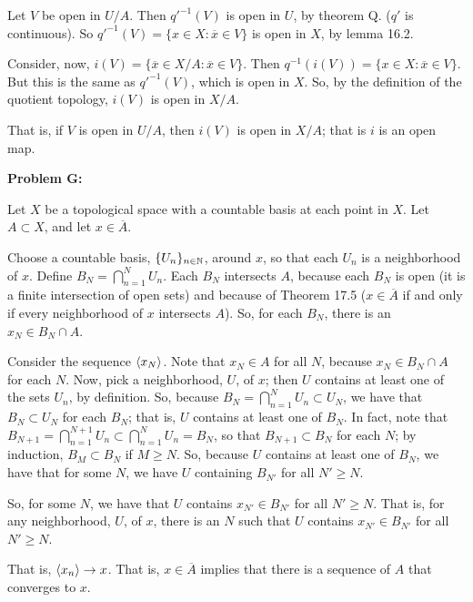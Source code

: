 \documentclass[a4paper,12pt]{article}
\begin{document}
Let $V$ be open in $U/A$. Then $q'^{-1}(V)$ is open in $U$, by theorem Q. ($q'$ is continuous). So $q'^{-1}(V) = \{x \in X: \overline{x} \in V\}$ is open in $X$, by lemma 16.2.

Consider, now, $i(V) = \{\overline{x} \in X/A: \overline{x} \in V\}$. Then $q^{-1}(i(V)) = \{x \in X: \overline{x} \in V\}$. But this is the same as $q'^{-1}(V)$, which is open in $X$. So, by the definition of the quotient topology, $i(V)$ is open in $X/A$.

That is, if $V$ is open in $U/A$, then $i(V)$ is open in $X/A$; that is $i$ is an open map.

\shunt

{\bf Problem G:}

Let $X$ be a topological space with a countable basis at each point in $X$. Let $A \subset X$, and let $x \in \overline{A}$.

Choose a countable basis, $\{U_n\}_{n \in \mathbb{N}}$, around $x$, so that each $U_n$ is a neighborhood of $x$. Define $B_N = \bigcap\limits_{n=1}^N U_n$. Each $B_N$ intersects $A$, because each $B_N$ is open (it is a finite intersection of open sets) and because of Theorem 17.5 ($x \in \overline{A}$ if and only if every neighborhood of $x$ intersects $A$). So, for each $B_N$, there is an $x_N \in B_N \cap A$. 

Consider the sequence $\left\langle x_N \right\rangle$. Note that $x_N \in A$ for all $N$, because $x_N \in B_N \cap A$ for each $N$. Now, pick a neighborhood, $U$, of $x$; then $U$ contains at least one of the sets $U_n$, by definition. So, because $B_N = \bigcap\limits_{n=1}^N U_n \subset U_N$, we have that $B_N \subset U_N$ for each $B_N$; that is, $U$ contains at least one of $B_N$. In fact, note that $B_{N+1} = \bigcap\limits_{n=1}^{N+1} U_n \subset \bigcap\limits_{n=1}^{N} U_n = B_N$, so that $B_{N+1} \subset B_N$ for each $N$; by induction, $B_{M} \subset B_N$ if $M \geq N$. So, because $U$ contains at least one of $B_N$, we have that for some $N$, we have $U$ containing $B_{N'}$ for all $N' \geq N$.

So, for some $N$, we have that $U$ contains $x_{N'} \in B_{N'}$ for all $N' \geq N$. That is, for any neighborhood, $U$, of $x$, there is an $N$ such that $U$ contains $x_{N'} \in B_{N'}$ for all $N' \geq N$.

That is, $\left\langle x_n \right\rangle \to x$. That is, $x \in \overline{A}$ implies that there is a sequence of $A$ that converges to $x$.

\shunt
\end{document}
